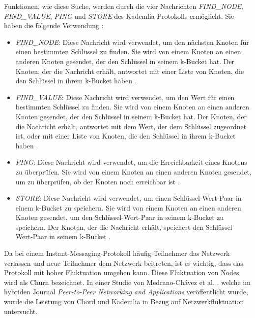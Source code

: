 Funktionen, wie diese Suche, werden durch die vier Nachrichten \textit{FIND\_NODE}, \\\textit{FIND\_VALUE}, \textit{PING} und \textit{STORE} des Kademlia-Protokolls ermöglicht. Sie haben die folgende Verwendung \Parencite[S. 3]{Maymounkov_Kademlia}:

\begin{itemize}
    \item \textit{FIND\_NODE}: Diese Nachricht wird verwendet, um den nächsten Knoten für einen bestimmten Schlüssel zu finden. Sie wird von einem Knoten an einen anderen Knoten gesendet, der den Schlüssel in seinem k-Bucket hat. Der Knoten, der die Nachricht erhält, antwortet mit einer Liste von Knoten, die den Schlüssel in ihrem k-Bucket haben \Parencite[S. 3]{Maymounkov_Kademlia}. 
    \item \textit{FIND\_VALUE}: Diese Nachricht wird verwendet, um den Wert für einen bestimmten Schlüssel zu finden. Sie wird von einem Knoten an einen anderen Knoten gesendet, der den Schlüssel in seinem k-Bucket hat. Der Knoten, der die Nachricht erhält, antwortet mit dem Wert, der dem Schlüssel zugeordnet ist, oder mit einer Liste von Knoten, die den Schlüssel in ihrem k-Bucket haben \Parencite[S. 3]{Maymounkov_Kademlia}.
    \item \textit{PING}: Diese Nachricht wird verwendet, um die Erreichbarkeit eines Knotens zu überprüfen. Sie wird von einem Knoten an einen anderen Knoten gesendet, um zu überprüfen, ob der Knoten noch erreichbar ist \Parencite[S. 2-3]{Maymounkov_Kademlia}.
    \item \textit{STORE}: Diese Nachricht wird verwendet, um einen Schlüssel-Wert-Paar in einem k-Bucket zu speichern. Sie wird von einem Knoten an einen anderen Knoten gesendet, um den Schlüssel-Wert-Paar in seinem k-Bucket zu speichern. Der Knoten, der die Nachricht erhält, speichert den Schlüssel-Wert-Paar in seinem k-Bucket \Parencite[S. 3]{Maymounkov_Kademlia}.
\end{itemize}

\noindent Da bei einem Instant-Messaging-Protokoll häufig Teilnehmer das Netzwerk verlassen und neue Teilnehmer dem Netzwerk beitreten, ist es wichtig, dass das Protokoll mit hoher Fluktuation umgehen kann. Diese Fluktuation von Nodes wird als Churn bezeichnet. In einer Studie von Medrano-Chávez et al. \parencite{MedranoChavez_ChordKademliaHighChurnScenarios}, welche im hybriden Journal \textit{Peer-to-Peer Networking and Applications} veröffentlicht wurde, wurde die Leistung von Chord und Kademlia in Bezug auf Netzwerkfluktuation untersucht. 

